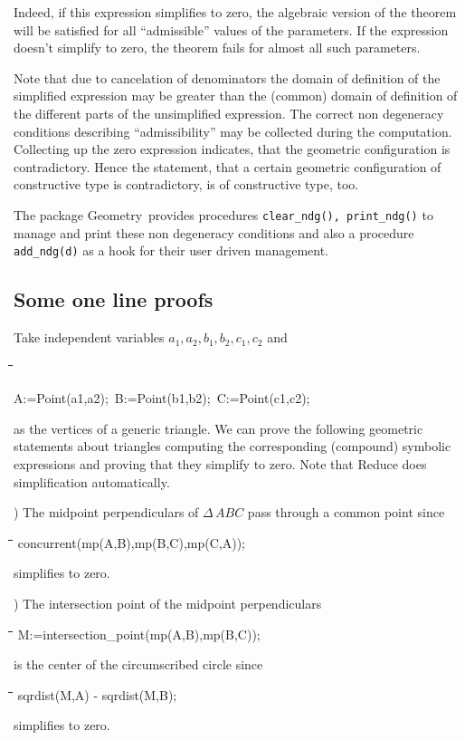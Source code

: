 \documentclass{article}
\newenvironment{code}{\tt \begin{tabbing}
\hspace*{1cm}\=\hspace*{1cm}\=\hspace*{1cm}\=
\hspace*{1cm}\=\hspace*{1cm}\=\kill
}{\end{tabbing}}
\newcommand{\geo}{{\sc Geometry}}
\begin{document}
Indeed, if this expression simplifies to zero, the algebraic version
of the theorem will be satisfied for all ``admissible'' values of the
parameters. If the expression doesn't simplify to zero, the theorem
fails for almost all such parameters.

Note that due to cancelation of denominators the domain of definition
of the simplified expression may be greater than the (common) domain
of definition of the different parts of the unsimplified
expression. The correct non degeneracy conditions describing
``admissibility'' may be collected during the computation. Collecting
up the zero expression indicates, that the geometric configuration is
contradictory. Hence the statement, that a certain geometric
configuration of constructive type is contradictory, is of
constructive type, too.

The package \geo\ provides procedures {\tt clear\_ndg(), print\_ndg()}
to manage and print these non degeneracy conditions and also a
procedure {\tt add\_ndg(d)} as a hook for their user driven
management.

\subsection{Some one line proofs}

Take independent variables $a_1,a_2,b_1,b_2,c_1,c_2$ and
\begin{code}
A:=Point(a1,a2);\ B:=Point(b1,b2);\ C:=Point(c1,c2); 
\end{code}
as the vertices of a generic triangle. We can prove the following
geometric statements about triangles computing the corresponding
(compound) symbolic expressions and proving that they simplify to
zero. Note that Reduce does simplification automatically.
\medskip

) The midpoint perpendiculars of $\Delta\,ABC$ pass through
a common point since
\begin{code}\+\>
concurrent(mp(A,B),mp(B,C),mp(C,A));
\end{code}
simplifies to zero.
\medskip

) The intersection point of the midpoint perpendiculars
\begin{code}\+\>
M:=intersection\_point(mp(A,B),mp(B,C));
\end{code}
is the center of the circumscribed circle since
\begin{code}\+\>
sqrdist(M,A) - sqrdist(M,B);	
\end{code}
simplifies to zero.
\medskip
\end{document}
